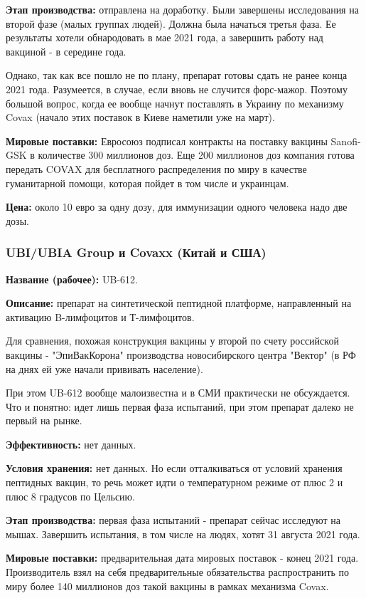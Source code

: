 \textbf{Этап производства:} отправлена на доработку. Были завершены исследования на
второй фазе (малых группах людей). Должна была начаться третья фаза. Ее
результаты хотели обнародовать в мае 2021 года, а завершить работу над вакциной
- в середине года.

Однако, так как все пошло не по плану, препарат готовы сдать не ранее конца
2021 года. Разумеется, в случае, если вновь не случится форс-мажор. Поэтому
большой вопрос, когда ее вообще начнут поставлять в Украину по механизму Covax
(начало этих поставок в Киеве наметили уже на март).

\textbf{Мировые поставки:} Евросоюз подписал контракты на поставку вакцины Sanofi-GSK в
количестве 300 миллионов доз. Еще 200 миллионов доз компания готова передать
COVAX для бесплатного распределения по миру в качестве гуманитарной помощи,
которая пойдет в том числе и украинцам. 

\textbf{Цена:} около 10 евро за одну дозу, для иммунизации одного человека надо
две дозы.

\subsubsection{UBI/UBIA Group и Covaxx (Китай и США)}

\textbf{Название (рабочее):} UB-612.

\textbf{Описание:} препарат на синтетической пептидной платформе, направленный на активацию B-лимфоцитов и Т-лимфоцитов.

Для сравнения, похожая конструкция вакцины у второй по счету российской вакцины
- "ЭпиВакКорона" производства новосибирского центра "Вектор" (в РФ на днях ей
уже начали прививать население). 

При этом UB-612 вообще малоизвестна и в СМИ практически не обсуждается. Что и
понятно: идет лишь первая фаза испытаний, при этом препарат далеко не первый на
рынке.

\textbf{Эффективность:} нет данных. 

\textbf{Условия хранения:} нет данных. Но если отталкиваться от условий хранения пептидных вакцин, то речь может идти о температурном режиме от плюс 2 и плюс 8 градусов по Цельсию. 

\textbf{Этап производства:} первая фаза испытаний - препарат сейчас исследуют на мышах. Завершить испытания, в том числе на людях, хотят 31 августа 2021 года. 

\textbf{Мировые поставки:} предварительная дата мировых поставок - конец 2021 года. Производитель взял на себя предварительные обязательства распространить по миру более 140 миллионов доз такой вакцины в рамках механизма Covax. 

